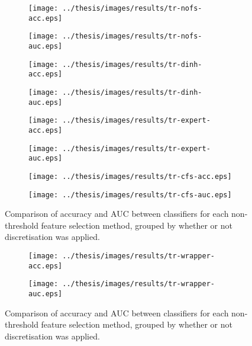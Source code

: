 \documentclass{article}
\begin{document}
\begin{figure*}[htbp]
\begin{subfigure}{.48\textwidth}
\texttt{[image: ../thesis/images/results/tr-nofs-acc.eps]}
\caption{}
\label{}
\end{subfigure}%
\begin{subfigure}{.55\textwidth}
\texttt{[image: ../thesis/images/results/tr-nofs-auc.eps]}
\caption{}
\label{}
\end{subfigure}

\begin{subfigure}{.48\textwidth}
\texttt{[image: ../thesis/images/results/tr-dinh-acc.eps]}
\caption{}
\label{}
\end{subfigure}%
\begin{subfigure}{.55\textwidth}
\texttt{[image: ../thesis/images/results/tr-dinh-auc.eps]}
\caption{}
\label{}
\end{subfigure}

\begin{subfigure}{.48\textwidth}
\texttt{[image: ../thesis/images/results/tr-expert-acc.eps]}
\caption{}
\label{}
\end{subfigure}%
\begin{subfigure}{.55\textwidth}
\texttt{[image: ../thesis/images/results/tr-expert-auc.eps]}
\caption{}
\label{}
\end{subfigure}

\begin{subfigure}{.48\textwidth}
\texttt{[image: ../thesis/images/results/tr-cfs-acc.eps]}
\caption{}
\label{fig:tr-nothreshold-cfs-acc}
\end{subfigure}%
\begin{subfigure}{.55\textwidth}
\texttt{[image: ../thesis/images/results/tr-cfs-auc.eps]}
\caption{}
\label{}
\end{subfigure}
\caption[]{Comparison of accuracy and AUC between classifiers for each non-threshold feature selection method, grouped by whether or not discretisation was applied.}
\label{fig:tr-nothreshold}
\end{figure*}

\begin{figure*}
\ContinuedFloat

\begin{subfigure}{.48\textwidth}
\texttt{[image: ../thesis/images/results/tr-wrapper-acc.eps]}
\caption{}
\label{}
\end{subfigure}%
\begin{subfigure}{.55\textwidth}
\texttt{[image: ../thesis/images/results/tr-wrapper-auc.eps]}
\caption{}
\label{}
\end{subfigure}
\caption[]{Comparison of accuracy and AUC between classifiers for each non-threshold feature selection method, grouped by whether or not discretisation was applied.}
\label{}
\end{figure*}
\end{document}
